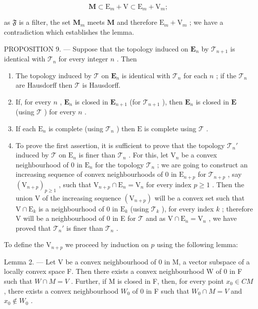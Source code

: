 \[
\mathbf {M} \subset \mathrm{E} _ {m} + \mathrm{V} \subset \mathrm{E} _ {m} + \mathrm{V} _ {m};
\]

as \(\mathfrak{F}\) is a filter, the set \(\mathbf{M}_m\) meets \(\mathbf{M}\) and therefore \(\mathrm{E}_m + \mathrm{V}_m\) ; we have a contradiction which establishes the lemma.

PROPOSITION 9. --- Suppose that the topology induced on \(\mathbf{E}_n\) by \(\mathcal{T}_{n+1}\) is identical with \(\mathcal{T}_n\) for every integer \(n\) . Then

\begin{enumerate}
\def\labelenumi{(\roman{enumi})}
\item
  The topology induced by \(\mathcal{T}\) on \(\mathbf{E}_n\) is identical with \(\mathcal{T}_n\) for each \(n\) ; if the \(\mathcal{T}_n\) are Hausdorff then \(\mathcal{T}\) is Hausdorff.
\item
  If, for every \(n\) , \(\mathbf{E}_n\) is closed in \(\mathbf{E}_{n+1}\) (for \(\mathcal{T}_{n+1}\) ), then \(\mathbf{E}_n\) is closed in \(\mathbf{E}\) (using \(\mathcal{T}\) ) for every \(n\) .
\item
  If each \(\mathrm{E}_n\) is complete (using \(\mathcal{T}_n\) ) then \(\mathrm{E}\) is complete using \(\mathcal{T}\) .
\item
  To prove the first assertion, it is sufficient to prove that the topology \(\mathcal{T}_n'\) induced by \(\mathcal{T}\) on \(\mathrm{E}_n\) is finer than \(\mathcal{T}_n\) . For this, let \(\mathrm{V}_n\) be a convex neighbourhood of 0 in \(\mathrm{E}_n\) for the topology \(\mathcal{T}_n\) ; we are going to construct an increasing sequence of convex neighbourhoods of 0 in \(\mathrm{E}_{n+p}\) for \(\mathcal{T}_{n+p}\) , say \((\mathrm{V}_{n+p})_{p\geqslant 1}\) , such that \(\mathrm{V}_{n+p} \cap \mathrm{E}_n = \mathrm{V}_n\) for every index \(p \geqslant 1\) . Then the union V of the increasing sequence \((\mathrm{V}_{n+p})\) will be a convex set such that \(\mathrm{V} \cap \mathrm{E}_k\) is a neighbourhood of 0 in \(\mathrm{E}_k\) (using \(\mathcal{T}_k\) ), for every index \(k\) ; therefore V will be a neighbourhood of 0 in E for \(\mathcal{T}\) and as \(\mathrm{V} \cap \mathrm{E}_n = \mathrm{V}_n\) , we have proved that \(\mathcal{T}_n'\) is finer than \(\mathcal{T}_n\) .
\end{enumerate}

To define the \(\mathrm{V}_{n + p}\) we proceed by induction on \(p\) using the following lemma:

Lemma 2. --- Let V be a convex neighbourhood of 0 in M, a vector subspace of a locally convex space F. Then there exists a convex neighbourhood W of 0 in F such that \(W \cap M = V\) . Further, if M is closed in F, then, for every point \(x_{0} \in C M\) , there exists a convex neighbourhood \(W_{0}\) of 0 in F such that \(W_{0} \cap M = V\) and \(x_{0} \notin W_{0}\) .

